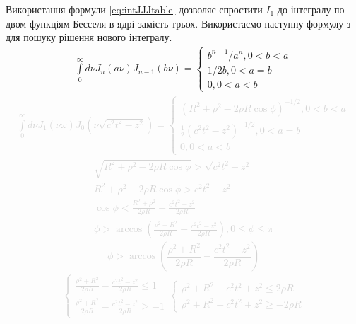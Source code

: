 Використання формули \eqref{eq:intJJJtable} дозволяє спростити $ I_1 $ до 
інтегралу по двом функціям Бесселя в ядрі замість трьох. Використаємо наступну 
формулу з \cite{Golubovic2013} для пошуку рішення нового інтегралу. 
%
\begin{equation} \begin{aligned} \label{eq:intJJtable}
\int\limits_{0}^{\infty} d \nu
J_n \left( a \nu \right) J_{n-1} \left( b \nu \right) = \begin{cases} 
b^{n-1} / a^n , 0 < b < a \\
1 / 2 b , 0 < a = b \\
0 , 0 < a < b
\end{cases} 
\end{aligned} \end{equation}
%
\textcolor{lightgray}{ \begin{equation*} \begin{aligned}
\int\limits_{0}^{\infty} d \nu J_1 \left( \nu \omega \right) 
J_0 \left( \nu \sqrt{c^2 t^2 - z^2} \right) = \begin{cases}
\left( R^2 + \rho^2 - 2 \rho R \cos \phi \right)^{-1/2}, 0 < b < a \\
\frac{1}{2} \left( c^2 t^2 - z^2 \right)^{-1/2}, 0 < a = b \\
0 , 0 < a < b
\end{cases} 
\end{aligned} \end{equation*} }
%
\textcolor{lightgray}{ \begin{equation*} \begin{aligned}
\sqrt{R^2 + \rho^2 - 2 \rho R \cos \phi} > \sqrt{c^2 t^2 - z^2} \\
R^2 + \rho^2 - 2 \rho R \cos \phi > c^2 t^2 - z^2 \\
\cos \phi < \frac{R^2 + \rho^2}{2 \rho R} - \frac{c^2 t^2 - z^2}{2 \rho R} \\
\phi > \arccos \left( \frac{\rho^2 + R^2}{2 \rho R} - 
\frac{c^2 t^2 - z^2}{2 \rho R} \right), 0 \leq \phi \leq \pi
\end{aligned} \end{equation*} }
%
\textcolor{lightgray}{ \begin{equation*}
\phi > \arccos \left( \frac{\rho^2 + R^2}{2 \rho R} - 
\frac{c^2 t^2 - z^2}{2 \rho R} \right)
\end{equation*} }
%
\textcolor{lightgray}{ \begin{equation*} \begin{aligned}
\begin{cases}
\frac{\rho^2 + R^2}{2 \rho R} - \frac{c^2 t^2 - z^2}{2 \rho R} \leq 1 \\
\frac{\rho^2 + R^2}{2 \rho R} - \frac{c^2 t^2 - z^2}{2 \rho R} \geq - 1
\end{cases}
\begin{cases}
\rho^2 + R^2 - c^2 t^2 + z^2 \leq 2 \rho R \\
\rho^2 + R^2 - c^2 t^2 + z^2 \geq - 2 \rho R
\end{cases}
\end{aligned} \end{equation*} }
